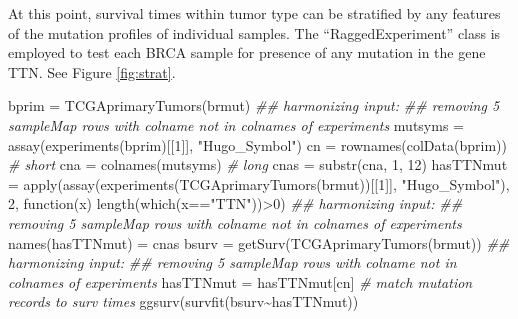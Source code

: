 \documentclass[]{article}
\newcommand{\hlnum}[1]{\textcolor[rgb]{0.816,0.125,0.439}{#1}}%
\newcommand{\hlstr}[1]{\textcolor[rgb]{0.251,0.627,0.251}{#1}}%
\newcommand{\hlcom}[1]{\textcolor[rgb]{0.502,0.502,0.502}{\textit{#1}}}%
\newcommand{\hlopt}[1]{\textcolor[rgb]{0,0,0}{#1}}%
\newcommand{\hlstd}[1]{\textcolor[rgb]{0.251,0.251,0.251}{#1}}%
\newcommand{\hlkwd}[1]{\textcolor[rgb]{0.878,0.439,0.125}{#1}}%
\newenvironment{Shaded}{\begin{myshaded}}{\end{myshaded}}
\newcommand{\KeywordTok}[1]{\hlkwd{#1}}
\newcommand{\DecValTok}[1]{\hlnum{#1}}
\newcommand{\StringTok}[1]{\hlstr{#1}}
\newcommand{\CommentTok}[1]{\hlcom{#1}}
\newcommand{\ControlFlowTok}[1]{\hlkwd{#1}}
\newcommand{\OperatorTok}[1]{\hlopt{#1}}
\newcommand{\NormalTok}[1]{\hlstd{#1}}
\begin{document}
At this point, survival times within tumor type can be stratified by any
features of the mutation profiles of individual samples.
The ``RaggedExperiment'' class is employed to test each BRCA sample for
presence of any mutation in the gene TTN. See Figure \ref{fig:strat}.

\begin{Shaded}
\begin{Highlighting}[]
\NormalTok{bprim =}\StringTok{ }\KeywordTok{TCGAprimaryTumors}\NormalTok{(brmut)}
\CommentTok{\#\# harmonizing input:}
\CommentTok{\#\#   removing 5 sampleMap rows with \textquotesingle{}colname\textquotesingle{} not in colnames of experiments}
\NormalTok{mutsyms =}\StringTok{ }\KeywordTok{assay}\NormalTok{(}\KeywordTok{experiments}\NormalTok{(bprim)[[}\DecValTok{1}\NormalTok{]], }\StringTok{"Hugo\_Symbol"}\NormalTok{)}
\NormalTok{cn =}\StringTok{ }\KeywordTok{rownames}\NormalTok{(}\KeywordTok{colData}\NormalTok{(bprim)) }\CommentTok{\# short}
\NormalTok{cna =}\StringTok{ }\KeywordTok{colnames}\NormalTok{(mutsyms) }\CommentTok{\# long}
\NormalTok{cnas =}\StringTok{ }\KeywordTok{substr}\NormalTok{(cna, }\DecValTok{1}\NormalTok{, }\DecValTok{12}\NormalTok{)}
\NormalTok{hasTTNmut =}\StringTok{ }\KeywordTok{apply}\NormalTok{(}\KeywordTok{assay}\NormalTok{(}\KeywordTok{experiments}\NormalTok{(}\KeywordTok{TCGAprimaryTumors}\NormalTok{(brmut))[[}\DecValTok{1}\NormalTok{]], }\StringTok{"Hugo\_Symbol"}\NormalTok{),}
  \DecValTok{2}\NormalTok{, }\ControlFlowTok{function}\NormalTok{(x) }\KeywordTok{length}\NormalTok{(}\KeywordTok{which}\NormalTok{(x}\OperatorTok{==}\StringTok{"TTN"}\NormalTok{))}\OperatorTok{\textgreater{}}\DecValTok{0}\NormalTok{)}
\CommentTok{\#\# harmonizing input:}
\CommentTok{\#\#   removing 5 sampleMap rows with \textquotesingle{}colname\textquotesingle{} not in colnames of experiments}
\KeywordTok{names}\NormalTok{(hasTTNmut) =}\StringTok{ }\NormalTok{cnas}
\NormalTok{bsurv =}\StringTok{ }\KeywordTok{getSurv}\NormalTok{(}\KeywordTok{TCGAprimaryTumors}\NormalTok{(brmut))}
\CommentTok{\#\# harmonizing input:}
\CommentTok{\#\#   removing 5 sampleMap rows with \textquotesingle{}colname\textquotesingle{} not in colnames of experiments}
\NormalTok{hasTTNmut =}\StringTok{ }\NormalTok{hasTTNmut[cn] }\CommentTok{\# match mutation records to surv times}
\KeywordTok{ggsurv}\NormalTok{(}\KeywordTok{survfit}\NormalTok{(bsurv}\OperatorTok{\textasciitilde{}}\NormalTok{hasTTNmut))}
\end{Highlighting}
\end{Shaded}
\end{document}
